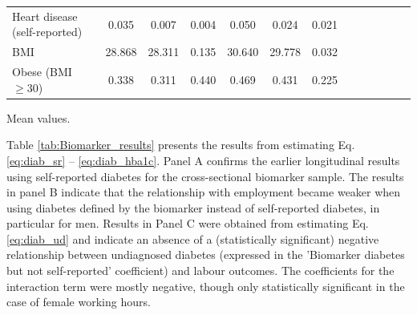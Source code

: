 \documentclass[12pt,english]{article}
\begin{document}
\begin{table}[!ht]
\begin{center}
\begin{adjustbox}{max width=\linewidth}
\begin{threeparttable}
{\begin{tabular}{l*{6}{S S}}
						Heart disease (self-reported)      &       0.035&       0.007&       0.004&       0.050&       0.024&       0.021\\
						BMI     &      28.868&      28.311&       0.135&      30.640&      29.778&       0.032\\
						Obese (BMI $\geq 30$)&       0.338&       0.311&       0.440&       0.469&       0.431&       0.225\\
						\bottomrule
					\end{tabular}
					\begin{tablenotes}
						\item \footnotesize  Mean values.
					\end{tablenotes}
				}
			\end{threeparttable}
		\end{adjustbox}
	\end{center}
\end{table}


Table \ref{tab:Biomarker_results} presents the results from estimating Eq. \ref{eq:diab_sr} -- \ref{eq:diab_hba1c}. Panel A confirms the earlier longitudinal results using self-reported diabetes for the cross-sectional biomarker sample. The results in panel B indicate that the relationship with employment became weaker when using diabetes defined by the biomarker instead of self-reported diabetes, in particular for men. Results in Panel C were obtained from estimating Eq. \ref{eq:diab_ud} and indicate an absence of a (statistically significant) negative relationship between undiagnosed diabetes (expressed in the 'Biomarker diabetes but not self-reported' coefficient) and labour outcomes. The coefficients for the interaction term were mostly negative, though only statistically significant in the case of female working hours. 
\end{document}
